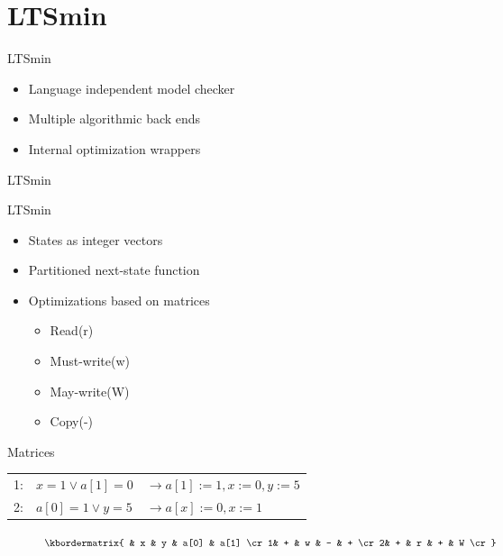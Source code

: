 \section{LTSmin}

\begin{frame}{LTSmin}
	\begin{itemize} 
		\item Language independent model checker
		\item Multiple algorithmic back ends
		\item Internal optimization wrappers	
	\end{itemize} 
\end{frame}	
	
\begin{frame}{LTSmin}
\begin{figure}[width=\textwidth] 
\scalebox{0.65}{}
\end{figure}
\end{frame}

\begin{frame}{LTSmin}
	\begin{itemize}
		\item States as integer vectors
	 	\item Partitioned next-state function
	 	\item Optimizations based on matrices
	 	\begin{itemize}
	 		\item Read(r)
	 		\item Must-write(w)
	 		\item May-write(W)
	 		\item Copy(-)
	 	\end{itemize}
	\end{itemize}
\end{frame}

\begin{frame}{Matrices}
\begin{center}
    \begin{tabular}{lll}
    1: & $x = 1 \vee a[1] = 0$ & $\rightarrow a[1] := 1, x:=0 , y:=5$  \\
    2: & $a[0] = 1 \vee y = 5$                     & $\rightarrow a[x] := 0, x:= 1$ \\
    \end{tabular}
\end{center}

\begin{figure}[h]
\centering
	\begin{math}
 \kbordermatrix{ 		               & x & y & a[0] & a[1] \cr
 									  1& + & w & -    & +    \cr
 									  2& + & r & +    & W    \cr}
	\end{math}
\end{figure}
\end{frame}

